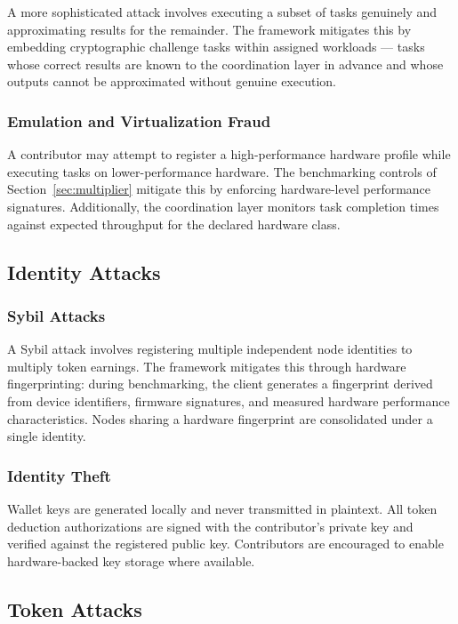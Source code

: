 \documentclass[12pt]{article}
\begin{document}
A more sophisticated attack involves executing a subset of tasks genuinely and approximating results for the remainder. The framework mitigates this by embedding cryptographic challenge tasks within assigned workloads — tasks whose correct results are known to the coordination layer in advance and whose outputs cannot be approximated without genuine execution.

\subsubsection{Emulation and Virtualization Fraud}

A contributor may attempt to register a high-performance hardware profile while executing tasks on lower-performance hardware. The benchmarking controls of Section~\ref{sec:multiplier} mitigate this by enforcing hardware-level performance signatures. Additionally, the coordination layer monitors task completion times against expected throughput for the declared hardware class.

\subsection{Identity Attacks}

\subsubsection{Sybil Attacks}

A Sybil attack involves registering multiple independent node identities to multiply token earnings. The framework mitigates this through hardware fingerprinting: during benchmarking, the client generates a fingerprint derived from device identifiers, firmware signatures, and measured hardware performance characteristics. Nodes sharing a hardware fingerprint are consolidated under a single identity.

\subsubsection{Identity Theft}

Wallet keys are generated locally and never transmitted in plaintext. All token deduction authorizations are signed with the contributor's private key and verified against the registered public key. Contributors are encouraged to enable hardware-backed key storage where available.

\subsection{Token Attacks}
\end{document}
